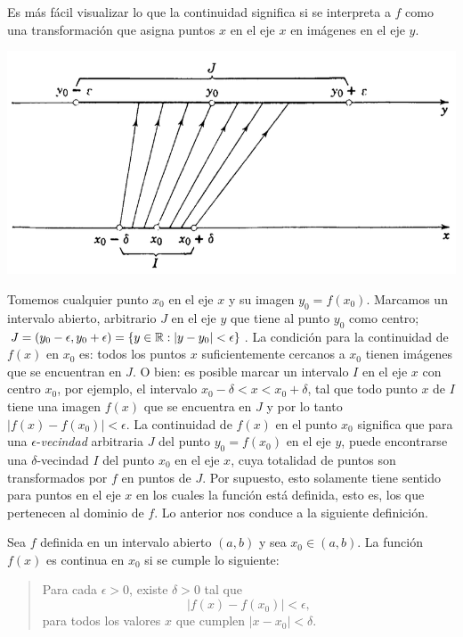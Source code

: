 Es más fácil visualizar lo que la continuidad significa si se interpreta a $f$ como una transformación que asigna puntos $x$ en el eje $x$ en imágenes en el eje $y$.

\centerline{\includegraphics[width=.8\textwidth]{pics/continuidad-1.png}}

Tomemos cualquier punto $x_0$ en el eje $x$ y su imagen $y_0 = f(x_0)$. 
Marcamos un intervalo abierto, arbitrario $J$ en el eje $y$ que tiene al punto $y_0$ como centro; $J = (y_0-\epsilon,y_0+\epsilon) = \{ y \in \mathbb{R} : |y-y_0|<\epsilon\}$.
La condición para la continuidad de $f(x)$ en $x_0$ es: todos los puntos $x$ suficientemente cercanos a $x_0$ tienen imágenes que se encuentran en $J$. O bien: es posible marcar un intervalo $I$ en el eje $x$ con centro $x_0$, por ejemplo, el intervalo $x_0-\delta < x < x_0+\delta$, tal que todo punto $x$ de $I$ tiene una imagen $f(x)$ que se encuentra en $J$ y por lo tanto $|f(x)-f(x_0)|<\epsilon$.
La continuidad de $f(x)$ en el punto $x_0$ significa que para una $\epsilon$-\emph{vecindad} arbitraria $J$ del punto $y_0=f(x_0)$ en el eje $y$, puede encontrarse una $\delta$-vecindad $I$ del punto $x_0$ en el eje $x$, cuya totalidad de puntos son transformados por $f$ en puntos de $J$.
Por supuesto, esto solamente tiene sentido para puntos en el eje $x$ en los cuales la función está definida, esto es, los que pertenecen al dominio de $f$. Lo anterior nos conduce a la siguiente definición.

\begin{definition}\label{D:continuidad}
Sea $f$ definida en un intervalo abierto $(a,b)$ y sea $x_0\in(a,b)$.
    La función $f(x)$ es continua en $x_0$ si se cumple lo siguiente:
    \begin{quote}
        Para cada $\epsilon > 0$, existe $\delta > 0$ tal que
        \[ 
        |f(x) - f(x_0)| < \epsilon,
        \]
        para todos los valores $x$ que cumplen $|x-x_0|<\delta$.
    \end{quote}
\end{definition}

